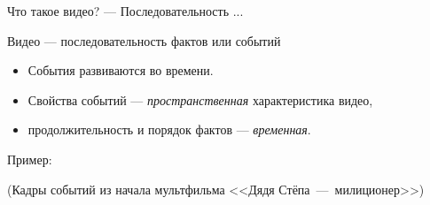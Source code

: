 
\newcommand{\epath}{./img/video/events}

\newcommand{\eventexample}[1]{
    \texttt{[image: \\epath/Djadja-Stepa-Milicioner-\#1.png]}
}


\begin{frame}{Что такое видео? — Последовательность ...}
    \begin{gray-box}{Видео — последовательность фактов или событий}
        \begin{itemize}
            \item События развиваются во времени.
            \item Свойства событий
            — {\it пространственная} характеристика видео,
            \item продолжительность и порядок фактов — {\it временная}.
        \end{itemize}%
    \end{gray-box}
    \vspace{1.5em}
    Пример:
    \begin{center}
        \footnotesize
        \color{zdarkgreen} 
        (Кадры событий из начала мультфильма 
        <<Дядя Стёпа~—~милиционер>>)
    \end{center}%
    
    
\end{frame}
